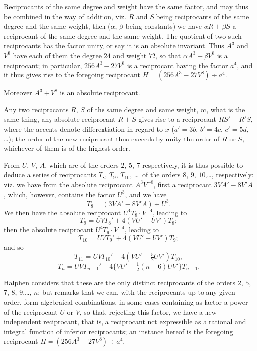 \documentclass[12pt,a4paper]{article}
\theoremstyle{plain}
\begin{document}
Reciprocants of the same degree and weight have the same factor, and may thus be combined in the way of addition, viz.
$R$ and $S$ being reciprocants of the same degree and the same weight, then ($\alpha$, $\beta$ being constants) we have $\alpha R + \beta S$ a reciprocant of the same degree and the same weight.
The quotient of two such reciprocants has the factor unity, or say it is an absolute invariant.
Thus $A^3$ and $V^8$ have each of them the degree $24$ and weight $72$, so that $\alpha A^3 + \beta V^8$ is a reciprocant; in particular, $256A^3 - 27V^8$ is a reciprocant having the factor $a^4$, and it thus gives rise to the foregoing reciprocant $H = (256A^3 - 27V^8) \div a^4$.

Moreover $A^3 + V^8$ is an absolute reciprocant.

Any two reciprocants $R$, $S$ of the same degree and same weight, or, what is the same thing, any absolute reciprocant $R + S$ gives rise to a reciprocant $RS' - R'S$, where the accents denote differentiation in regard to $x$ ($a' = 3b$, $b' = 4c$, $c' = 5d$, \dots); the order of the new reciprocant thus exceeds by unity the order of $R$ or $S$, whichever of them is of the highest order.

From $U$, $V$, $A$, which are of the orders $2$, $5$, $7$ respectively, it is thus possible to deduce a series of reciprocants $T_8$, $T_9$, $T_{10}$, \dots\ of the orders $8$, $9$, $10$,\dots, respectively: viz.
we have from the absolute reciprocant $A^3V^{-8}$, first a reciprocant $3VA' - 8V'A$, which, however, contains the factor $U^3$, and we have
\[
T_8 = (3VA' - 8V'A) \div U^3.
\]
We then have the absolute reciprocant $U^4T_8 \cdot V^{-4}$, leading to
\[
T_9 = UVT_8' + 4(VU' - UV')T_8;
\]
then the absolute reciprocant $U^4T_9 \cdot V^{-4}$, leading to
\[
T_{10} = UVT_9' + 4(VU' - UV')T_9;
\]
and so
\[
T_{11} = UVT_{10}' + 4(VU' - \tfrac{5}{2}UV')T_{10},
\]
\[
T_n = UVT_{n-1}' + 4\{VU' - \tfrac{1}{2}(n-6)UV'\}T_{n-1}.
\]

Halphen considers that these are the only distinct reciprocants of the orders $2$, $5$, $7$, $8$, $9$,\dots, $n$; but remarks that we can, with the reciprocants up to any given order, form algebraical combinations, in some cases containing as factor a power of the reciprocant $U$ or $V$, so that, rejecting this factor, we have a new independent reciprocant, that is, a reciprocant not expressible as a rational and integral function of inferior reciprocants; an instance hereof is the foregoing reciprocant $H = (256A^3 - 27V^8) \div a^4$.
\end{document}
